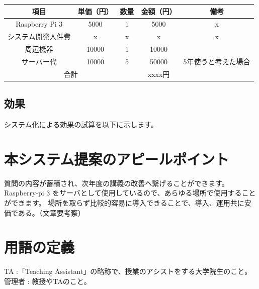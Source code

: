 \documentclass[a4j,titlepage]{ujarticle}
\begin{document}
\begin{table}[htb]
  \begin{tabular}{|c|c|c|c|c|} \hline
    項目 & 単価（円） & 数量 & 金額（円） & 備考 \\ \hline
     Raspberry Pi 3&  5000&  1&  5000& x \\ \hline
     システム開発人件費&  x& x & x &x  \\ \hline
     周辺機器&  10000&  1&  10000&  \\ \hline
      サーバー代&  10000&  5&  50000&5年使うと考えた場合  \\ \hline
    \multicolumn{3}{c||}{合計}& xxxx円 &  \\ \hline
  \end{tabular}
\end{table}

\subsection{効果}
システム化による効果の試算を以下に示します。

\section{本システム提案のアピールポイント}
質問の内容が蓄積され、次年度の講義の改善へ繋げることができます。
Raspberry-pi 3 をサーバとして使用しているので、あらゆる場所で使用することができます。
場所を取らず比較的容易に導入できることで、導入、運用共に安価である。（文章要考察）

\section{用語の定義}
TA :「Teaching Assistant」の略称で、授業のアシストをする大学院生のこと。
管理者 : 教授やTAのこと。




\newpage
\end{document}
